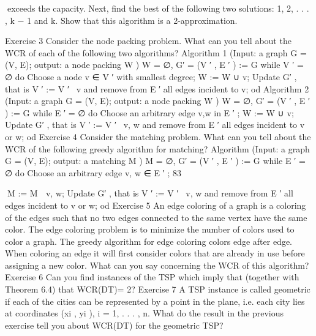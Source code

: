 exceeds the capacity. Next, find the best of the following two solutions: {1, 2, . . . , k − 1} and {k}.
Show that this algorithm is a 2-approximation.

Exercise 3
Consider the node packing problem. What can you tell about the WCR of each of the following two
algorithms?
Algorithm 1 (Input: a graph G = (V, E); output: a node packing W )
W = ∅, G′ = (V ′ , E ′ ) := G
while V ′ = ∅
do
Choose a node v ∈ V ′ with smallest degree;
W := W ∪ {v};
Update G′ , that is V ′ := V ′ \ {v} and remove from E ′ all edges incident to v;
od
Algorithm 2 (Input: a graph G = (V, E); output: a node packing W )
W = ∅, G′ = (V ′ , E ′ ) := G
while E ′ = ∅
do
Choose an arbitrary edge {v,w} in E ′ ;
W := W ∪ {v};
Update G′ , that is V ′ := V ′ \ {v, w} and remove from E ′ all edges incident to v or w;
od
Exercise 4
Consider the matching problem. What can you tell about the WCR of the following greedy algorithm
for matching?
Algorithm (Input: a graph G = (V, E); output: a matching M )
M = ∅, G′ = (V ′ , E ′ ) := G
while E ′ = ∅
do
Choose an arbitrary edge {v, w} ∈ E ′ ;
83

M := M ∪ {v, w};
Update G′ , that is V ′ := V ′ \ {v, w} and remove from E ′ all edges incident to v or w;
od
Exercise 5
An edge coloring of a graph is a coloring of the edges such that no two edges connected to the same
vertex have the same color. The edge coloring problem is to minimize the number of colors used to color
a graph. The greedy algorithm for edge coloring colors edge after edge. When coloring an edge it will
first consider colors that are already in use before assigning a new color. What can you say concerning
the WCR of this algorithm?
Exercise 6
Can you find instances of the TSP which imply that (together with Theorem 6.4) that WCR(DT)= 2?
Exercise 7
A TSP instance is called geometric if each of the cities can be represented by a point in the plane, i.e.
each city lies at coordinates (xi , yi ), i = 1, . . . , n. What do the result in the previous exercise tell you
about WCR(DT) for the geometric TSP?